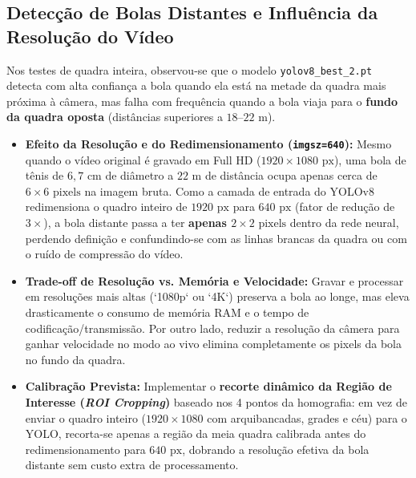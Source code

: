 \documentclass[a4paper,11pt]{article}
\begin{document}
\subsection{Detecção de Bolas Distantes e Influência da Resolução do Vídeo}
Nos testes de quadra inteira, observou-se que o modelo \texttt{yolov8\_best\_2.pt} detecta com alta confiança a bola quando ela está na metade da quadra mais próxima à câmera, mas falha com frequência quando a bola viaja para o \textbf{fundo da quadra oposta} (distâncias superiores a $18\text{--}22\text{ m}$).
\begin{itemize}[nosep]
  \item \textbf{Efeito da Resolução e do Redimensionamento (\texttt{imgsz=640}):} Mesmo quando o vídeo original é gravado em Full HD ($1920 \times 1080\text{ px}$), uma bola de tênis de $6{,}7\text{ cm}$ de diâmetro a $22\text{ m}$ de distância ocupa apenas cerca de $6 \times 6\text{ pixels}$ na imagem bruta. Como a camada de entrada do YOLOv8 redimensiona o quadro inteiro de $1920\text{ px}$ para $640\text{ px}$ (fator de redução de $3\times$), a bola distante passa a ter \textbf{apenas $2 \times 2\text{ pixels}$} dentro da rede neural, perdendo definição e confundindo-se com as linhas brancas da quadra ou com o ruído de compressão do vídeo.
  \item \textbf{Trade-off de Resolução vs. Memória e Velocidade:} Gravar e processar em resoluções mais altas (`1080p` ou `4K`) preserva a bola ao longe, mas eleva drasticamente o consumo de memória RAM e o tempo de codificação/transmissão. Por outro lado, reduzir a resolução da câmera para ganhar velocidade no modo ao vivo elimina completamente os pixels da bola no fundo da quadra.
  \item \textbf{Calibração Prevista:} Implementar o \textbf{recorte dinâmico da Região de Interesse (\textit{ROI Cropping})} baseado nos 4 pontos da homografia: em vez de enviar o quadro inteiro ($1920 \times 1080$ com arquibancadas, grades e céu) para o YOLO, recorta-se apenas a região da meia quadra calibrada antes do redimensionamento para $640\text{ px}$, dobrando a resolução efetiva da bola distante sem custo extra de processamento.
\end{itemize}
\end{document}
